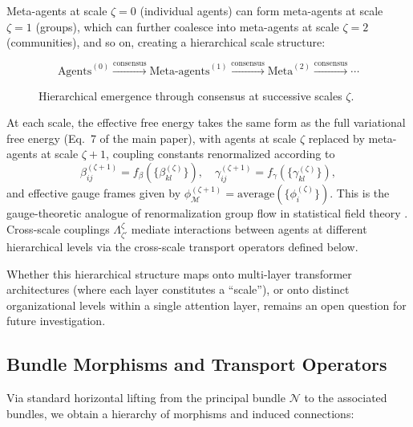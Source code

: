 \documentclass[twoside,11pt]{article}
\begin{document}
Meta-agents at scale $\zeta=0$ (individual agents) can form meta-agents at scale $\zeta=1$ (groups), which can further coalesce into meta-agents at scale $\zeta=2$ (communities), and so on, creating a hierarchical scale structure:

\begin{figure}[h]
\centering
\small
\[
\text{Agents}^{(0)} \xrightarrow{\text{consensus}}
\text{Meta-agents}^{(1)} \xrightarrow{\text{consensus}}
\text{Meta}^{(2)} \xrightarrow{\text{consensus}} \cdots
\]
\caption{Hierarchical emergence through consensus at successive scales $\zeta$.}
\label{fig:hierarchy}
\end{figure}

At each scale, the effective free energy takes the same form as the full variational free energy (Eq.~7 of the main paper), with agents at scale $\zeta$ replaced by meta-agents at scale $\zeta+1$, coupling constants renormalized according to
\begin{equation*}
  \beta_{ij}^{(\zeta+1)} = f_\beta(\{\beta_{kl}^{(\zeta)}\}), \quad
  \gamma_{ij}^{(\zeta+1)} = f_\gamma(\{\gamma_{kl}^{(\zeta)}\}),
\end{equation*}
and effective gauge frames given by $\phi_{\mathcal{M}}^{(\zeta+1)} = \text{average}(\{\phi_i^{(\zeta)}\})$.
This is the gauge-theoretic analogue of renormalization group flow in statistical field theory \citep{anderson1984basic,wilson1974renormalization,garciaMillan2024network}. Cross-scale couplings $\Lambda^{\zeta}_{\zeta'}$ mediate interactions between agents at different hierarchical levels via the cross-scale transport operators defined below.

Whether this hierarchical structure maps onto multi-layer transformer architectures (where each layer constitutes a ``scale''), or onto distinct organizational levels within a single attention layer, remains an open question for future investigation.

\subsection{Bundle Morphisms and Transport Operators}
Via standard horizontal lifting from the principal bundle $\mathcal{N}$ to the associated bundles, we obtain a hierarchy of morphisms and induced connections:
\end{document}
